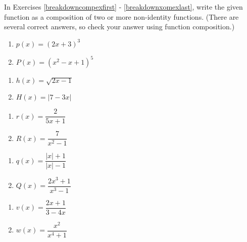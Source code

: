 In Exercises \ref{breakdowncompexfirst} - \ref{breakdownxomexlast},  write the given function as a composition of two or more non-identity functions.  (There are several correct answers, so check your answer using function composition.)

\begin{multicols}{2}
\begin{enumerate}
\setcounter{enumi}{\value{HW}}

\item  $p(x) = (2x+3)^3$ \label{breakdowncompexfirst}
\item  $P(x) = \left(x^2-x+1\right)^5$

\setcounter{HW}{\value{enumi}}
\end{enumerate}
\end{multicols}

\begin{multicols}{2}
\begin{enumerate}
\setcounter{enumi}{\value{HW}}

\item  $h(x) = \sqrt{2x-1}$
\item  $H(x) = |7-3x|$

\setcounter{HW}{\value{enumi}}
\end{enumerate}
\end{multicols}

\begin{multicols}{2}
\begin{enumerate}
\setcounter{enumi}{\value{HW}}

\item  $r(x) = \dfrac{2}{5x+1}$
\item  $R(x) = \dfrac{7}{x^2-1}$

\setcounter{HW}{\value{enumi}}
\end{enumerate}
\end{multicols}

\begin{multicols}{2}
\begin{enumerate}
\setcounter{enumi}{\value{HW}}

\item  $q(x) = \dfrac{|x|+1}{|x|-1}$
\item  $Q(x) = \dfrac{2x^3+1}{x^3-1}$

\setcounter{HW}{\value{enumi}}
\end{enumerate}
\end{multicols}

\begin{multicols}{2}
\begin{enumerate}
\setcounter{enumi}{\value{HW}}

\item  $v(x) = \dfrac{2x+1}{3-4x}$
\item  $w(x) = \dfrac{x^2}{x^4+1}$ \label{breakdownxomexlast}

\setcounter{HW}{\value{enumi}}
\end{enumerate}
\end{multicols}

